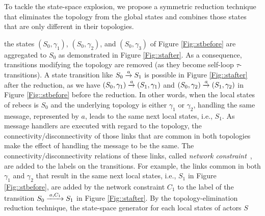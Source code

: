 
To tackle the state-space explosion, we propose a  symmetric reduction  technique  that  eliminates  the  topology  from  the global  states  and  combines  those  states  that  are  only  different  in  their  topologies. 

    the states $(S_0,\gamma_1)$, $(S_0,\gamma_2)$, and $(S_0,\gamma_3)$ of Figure \ref{Fig::stbefore} are aggregated to $S_0$ as demonstrated in Figure \ref{Fig::stafter}. As a consequence, transitions modifying the topology are removed (as they become self-loop $\tau$-transitions). 
A state transition like $S_0\overto{a} S_1$ is possible in Figure \ref{Fig::stafter} after the reduction, as we have $(S_0,\gamma_1)\overto{a}(S_1,\gamma_1)$ and $(S_0,\gamma_2)\overto{a}(S_1,\gamma_2)$ in Figure \ref{Fig::stbefore} before the reduction. In other words, when the local states of rebecs is $S_0$ and the underlying topology is either $\gamma_1$ or $\gamma_2$, handling the same message, represented by $a$, leads to the same next local states, i.e., $S_1$.  As message handlers are executed with regard to the topology, the connectivity/disconnectivity of those links that are common in both topologies make the effect of handling the message to be the same. The connectivity/disconnectivity relations of these links, called \emph{network constraint}~\cite{FatemehFI10,FatemehFI19},  are added to the labels on the transitions. For example, the links common in both $\gamma_{1}$ and $\gamma_{2}$ that result in the same next local states, i.e., $S_1$ in Figure \ref{Fig::stbefore}, are added by the network constraint $C_1$ to the label of the transition $S_0\overto{a,C_1}S_1$ in Figure \ref{Fig::stafter}. %
By the topology-elimination reduction technique, the state-space generator for each local states of actors $S$ %

